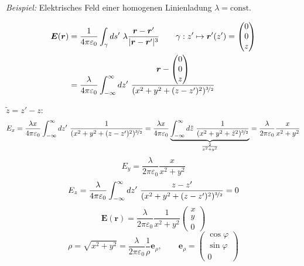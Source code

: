 \documentclass[titlepage,11pt,a4paper,ngerman]{report}
\newcommand{\tx}[1]{\textrm{#1}}
\newcommand{\const}{\tx{const.}}
\newcommand{\kq}{\frac{1}{4\pi\epsilon_0}}
\newcommand{\intt}[2]{\int_{#1}^{#2}}
\renewcommand{\vec}[1]{\boldsymbol{#1}}
\renewcommand{\epsilon}{\varepsilon}
\begin{document}
\emph{Beispiel:} Elektrisches Feld einer homogenen Linienladung $ \lambda = \const $

\begin{minipage}{.2\linewidth}
	\centering
\end{minipage}
\begin{minipage}{.8\linewidth}
	\begin{align*}
	\vec{E}(\vec{r}) &= \kq \int_\gamma ds'\ \lambda \frac{\vec{r} - \vec{r}'}{|\vec{r} - \vec{r}'|^3} \qquad \gamma: z' \mapsto \vec{r}'(z') = \begin{pmatrix} 0 \\ 0\\ z \end{pmatrix}\\
	&= \frac{\lambda}{4 \pi \epsilon_0} \intt{-\infty}{\infty}dz'\ \frac{\vec{r} - \begin{pmatrix} 0 \\ 0\\ z \end{pmatrix}}{(x^2 + y^2 + (z-z')^2)^{\nicefrac{3}{2}}}
	\end{align*}
\end{minipage}

$\tilde{z} = z' - z$:
$$E_x = \frac{\lambda x}{4 \pi \epsilon_0}\intt{-\infty}{\infty}dz'\ \frac{1}{(x^2 + y^2 + (z-z')^2)^{\nicefrac{3}{2}}} = \frac{\lambda x}{4 \pi \epsilon_0}\underbrace{\intt{-\infty}{\infty}d\tilde{z}\ \frac{1}{(x^2 + y^2 + \tilde{z}^2)^{\nicefrac{3}{2}}}}_{\frac{2}{x^2 + y^2}} = \frac{\lambda}{2 \pi \epsilon_0} \frac{x}{x^2 + y^2}$$
$$E_y = \frac{\lambda}{2 \pi \epsilon_0}\frac{x}{x^2 + y^2}$$
$$E_z = \frac{\lambda}{4 \pi \epsilon_0} \intt{-\infty}{\infty}dz'\ \frac{z-z'}{(x^2 + y^2 + (z-z')^2)^{\nicefrac{3}{2}}} = 0$$
$$\vec{E}(\vec{r}) = \frac{\lambda}{2 \pi \epsilon_0} \frac{1}{x^2 + y^2} \begin{pmatrix}x\\ y\\ 0\end{pmatrix}$$
$$\rho = \sqrt{x^2 + y^2} = \frac{\lambda}{2 \pi \epsilon_0} \frac{1}{\rho}\vec{e}_\rho, \qquad \vec{e}_\rho = \begin{pmatrix}\cos \varphi\\ \sin \varphi\\ 0\end{pmatrix}$$
\end{document}
